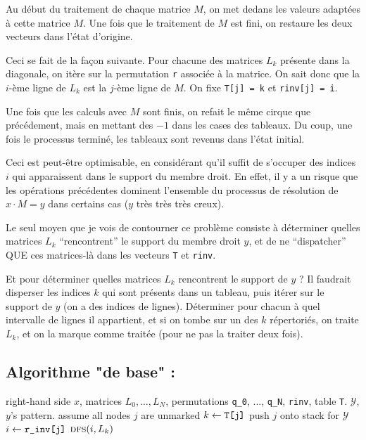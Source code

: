 \documentclass{article}
\begin{document}
Au début du traitement de chaque matrice $M$, on met dedans les
valeurs adaptées à cette matrice $M$. Une fois que le traitement de
$M$ est fini, on restaure les deux vecteurs dans l'état d'origine.

Ceci se fait de la façon suivante.  Pour chacune des matrices $L_k$
présente dans la diagonale, on itère sur la permutation \verb|r|
associée à la matrice. On sait donc que la $i$-ème ligne de $L_k$ est
la $j$-ème ligne de $M$. On fixe \verb|T[j] = k| et \verb|rinv[j] = i|.

Une fois que les calculs avec $M$ sont finis, on refait le même
cirque que précédement, mais en mettant des $-1$ dans les cases des
tableaux. Du coup, une fois le processus terminé, les tableaux sont
revenus dans l'état initial.

Ceci est peut-être optimisable, en considérant qu'il suffit de
s'occuper des indices $i$ qui apparaissent dans le support du membre
droit. En effet, il y a un risque que les opérations précédentes
dominent l'ensemble du processus de résolution de $x \cdot M = y$ dans
certains cas ($y$ très très très creux).

Le seul moyen que je vois de contourner ce problème consiste à
déterminer quelles matrices $L_k$ ``rencontrent'' le support du membre
droit $y$, et de ne ``dispatcher'' QUE ces matrices-là dans les
vecteurs \verb|T| et \verb|rinv|. 

Et pour déterminer quelles matrices $L_k$ rencontrent le support de
$y$ ? Il faudrait disperser les indices $k$ qui sont présents dans un
tableau, puis itérer sur le support de $y$ (on a des indices de
lignes). Déterminer pour chacun à quel intervalle de lignes il
appartient, et si on tombe sur un des $k$ répertoriés, on traite
$L_k$, et on la marque comme traitée (pour ne pas la traiter deux fois).

\subsection{Algorithme "de base" :}

\begin{algorithmic}
\Require right-hand side $x$, matrices $L_0, \ldots, L_N$, permutations \verb$q_0$, ..., \verb$q_N$, \verb$rinv$, table \verb$T$.
\Ensure $\mathcal{Y}$, $y$'s pattern.
\State assume all nodes $j$ are unmarked
\State $k \gets \verb|T[j]|$
\State push $j$ onto stack for $\mathcal{Y}$
\Else
\State $i \gets \verb|r_inv[j]|$
\State $\textsc{dfs}(i, L_k)$
\EndIf
\EndIf
\EndFor   
\end{algorithmic}   
\end{document}
